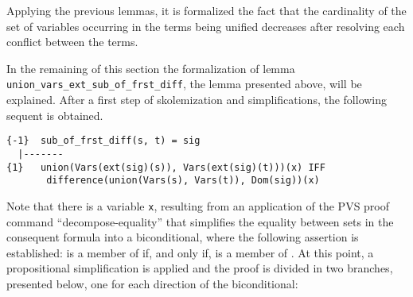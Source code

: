\documentclass[submission,copyright,creativecommons]{eptcs}
\begin{document}
  Applying the previous lemmas, it is formalized the fact that the
  cardinality of the set of variables occurring in the terms being
  unified decreases after resolving each conflict between the terms.


  In the remaining of this section the formalization of lemma {\tt
    union\_vars\_ext\_sub\_of\_frst\_diff}, the lemma presented above, will be
  explained.  After a first step of skolemization and simplifications,
  the following sequent is obtained.

  {\small
\begin{verbatim}
{-1}  sub_of_frst_diff(s, t) = sig
  |-------
{1}   union(Vars(ext(sig)(s)), Vars(ext(sig)(t)))(x) IFF
       difference(union(Vars(s), Vars(t)), Dom(sig))(x)
\end{verbatim}
  }

  Note that there is a variable {\tt x}, resulting from an application
  of the PVS proof command ``decompose-equality'' that simplifies the
  equality between sets in the consequent formula into a
  biconditional, where the following assertion is established:  is
  a member of  if, and
  only if,  is a member of . At this point, a propositional simplification is
  applied and the proof is divided in two branches, presented below,
  one for each direction of the biconditional:
\end{document}

